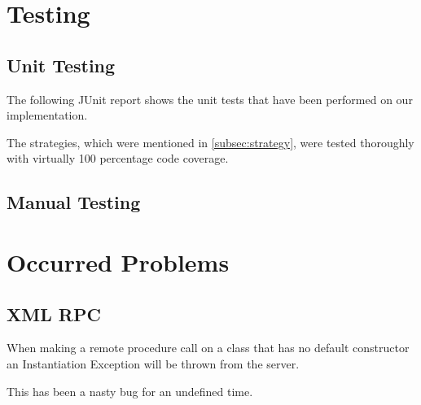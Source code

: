 \documentclass[11pt, a4paper]{article}
\begin{document}

\section{Testing}

\subsection{Unit Testing}

The following JUnit report shows the unit tests that have been
performed on our implementation. 

The strategies, which were mentioned in \ref{subsec:strategy}, were
tested thoroughly with virtually 100 percentage code coverage.

\subsection{Manual Testing}


\section{Occurred Problems}

\subsection{XML RPC}

When making a remote procedure call on a class that has no default
constructor an Instantiation Exception will be thrown from the server.

This has been a nasty bug for an undefined time. 

\nocite{*}


\end{document}
